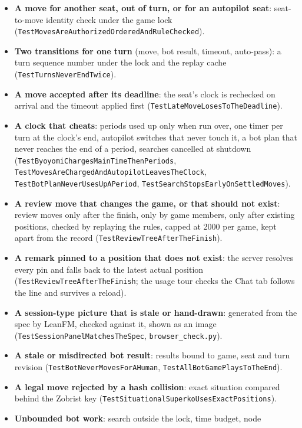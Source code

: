 \documentclass[11pt,oneside]{book}
\begin{document}
\begin{itemize}
  \item \textbf{A move for another seat, out of turn, or for an autopilot seat}:
  seat-to-move identity check under the game lock
  (\texttt{TestMovesAreAuthorizedOrderedAndRuleChecked}).
  \item \textbf{Two transitions for one turn} (move, bot result, timeout,
  auto-pass): a turn sequence number under the lock and the replay cache
  (\texttt{TestTurnsNeverEndTwice}).
  \item \textbf{A move accepted after its deadline}: the seat's clock is
  rechecked on arrival and the timeout applied first
  (\texttt{TestLateMoveLosesToTheDeadline}).
  \item \textbf{A clock that cheats}: periods used up only when run over, one
  timer per turn at the clock's end, autopilot switches that never touch it, a
  bot plan that never reaches the end of a period, searches cancelled at
  shutdown (\texttt{TestByoyomiChargesMainTimeThenPeriods},
  \texttt{TestMovesAreChargedAndAutopilotLeavesTheClock},
  \texttt{TestBotPlanNeverUsesUpAPeriod}, \texttt{TestSearchStopsEarlyOnSettledMoves}).
  \item \textbf{A review move that changes the game, or that should not
  exist}: review moves only after the finish, only by game members, only after
  existing positions, checked by replaying the rules, capped at 2000 per game,
  kept apart from the record (\texttt{TestReviewTreeAfterTheFinish}).
  \item \textbf{A remark pinned to a position that does not exist}: the
  server resolves every pin and falls back to the latest actual position
  (\texttt{TestReviewTreeAfterTheFinish}; the usage tour checks the Chat tab
  follows the line and survives a reload).
  \item \textbf{A session-type picture that is stale or hand-drawn}: generated
  from the spec by LeanFM, checked against it, shown as an image
  (\texttt{TestSessionPanelMatchesTheSpec}, \texttt{browser\_check.py}).
  \item \textbf{A stale or misdirected bot result}: results bound to game, seat
  and turn revision (\texttt{TestBotNeverMovesForAHuman},
  \texttt{TestAllBotGamePlaysToTheEnd}).
  \item \textbf{A legal move rejected by a hash collision}: exact situation
  compared behind the Zobrist key (\texttt{TestSituationalSuperkoUsesExactPositions}).
  \item \textbf{Unbounded bot work}: search outside the lock, time budget, node

\end{itemize}
\end{document}
